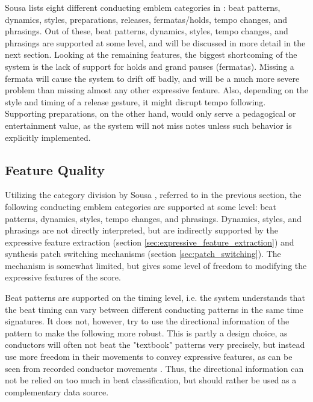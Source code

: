 Sousa lists eight different
conducting emblem categories in \cite{sousa1988}:
beat patterns, dynamics, styles,
preparations, releases, fermatas/holds,
tempo changes, and phrasings.
Out of these,
beat patterns, dynamics, styles,
tempo changes, and phrasings are supported at some level,
and will be discussed in more detail in
the next section. %
Looking at the remaining features,
the biggest shortcoming of the system
is the lack of support for
holds and grand pauses (fermatas).
Missing a fermata will cause the system
to drift off badly,
and will be a much more severe problem
than missing almost any other expressive feature.
Also, depending on the style and timing of a release gesture,
it might disrupt tempo following.
Supporting preparations, on the other hand,
would only serve a pedagogical or entertainment value,
as the system will not miss notes
unless such behavior is explicitly implemented.


\subsection{Feature Quality}
\label{sec:feature_quality}

Utilizing the category division by Sousa \cite{sousa1988},
referred to in the previous section,
the following conducting emblem categories are
supported at some level:
beat patterns, dynamics, styles,
tempo changes, and phrasings.
Dynamics, styles, and phrasings
are not directly interpreted,
but are indirectly supported by the
expressive feature extraction
(section \ref{sec:expressive_feature_extraction})
and synthesis patch switching mechanisms
(section \ref{sec:patch_switching}).
The mechanism is somewhat limited,
but gives some level of freedom to modifying
the expressive features of the score.

Beat patterns are supported on the timing level,
i.e. the system understands that the beat timing
can vary between different conducting patterns
in the same time signatures.
It does not, however,
try to use the directional information of the pattern
to make the following more robust.
This is partly a design choice,
as conductors will often not beat
the "textbook" patterns very precisely,
but instead use more freedom in their movements
to convey expressive features,
as can be seen from recorded conductor movements \cite{luck2006}.
Thus, the directional information
can not be relied on too much
in beat classification,
but should rather be used as a complementary data source.


